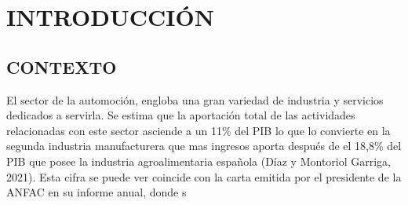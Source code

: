 \begin{titlepage}
\begin{center}
\noindent{}
\end{center}

\hspace{-3.2cm}
\noindent{}

\end{titlepage}

\tableofcontents

\newpage 

\section{INTRODUCCIÓN}


\subsection{CONTEXTO}
El sector de la automoción, engloba una gran variedad de industria  y servicios dedicados a servirla. Se estima que la aportación total de las actividades relacionadas con este sector asciende a un 11\% del PIB lo que lo convierte en la segunda industria manufacturera que mas  ingresos aporta después de el 18,8\% del PIB que posee  la industria agroalimentaria española (Díaz y Montoriol Garriga, 2021). Esta cifra se puede ver coincide con la carta emitida por el presidente de la ANFAC en su informe anual, donde s

